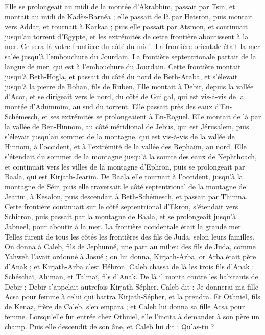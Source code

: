 \begin{multicols}{2}
Elle se prolongeait au midi de la montée d’Akrabbim, passait par Tsin, et montait au midi de Kadès-Barnéa ; elle passait de là par Hetsron, puis montait vers Addar, et tournait à Karkaa ;
puis elle passait par Atsmon, et continuait jusqu’au torrent d’Egypte, et les extrémités de cette frontière aboutissent à la mer. Ce sera là votre frontière du côté du midi.
La frontière orientale était la mer salée jusqu’à l’embouchure du Jourdain. La frontière septentrionale partait de la langue de mer, qui est à l’embouchure du Jourdain.
Cette frontière montait jusqu’à Beth-Hogla, et passait du côté du nord de Beth-Araba, et s’élevait jusqu’à la pierre de Bohan, fils de Ruben.
Elle montait à Debir, depuis la vallée d’Acor, et se dirigeait vers le nord, du côté de Guilgal, qui est vis-à-vis de la montée d’Adummim, au sud du torrent. Elle passait près des eaux d’En-Schémesch, et ses extrémités se prolongeaient à En-Roguel.
Elle montait de là par la vallée de Ben-Hinnom, au côté méridional de Jebus, qui est Jérusalem, puis s’élevait jusqu’au sommet de la montagne, qui est vis-à-vis de la vallée de Hinnom, à l’occident, et à l’extrémité de la vallée des Rephaïm, au nord.
Elle s’étendait du sommet de la montagne jusqu’à la source des eaux de Nephthoach, et continuait vers les villes de la montagne d’Ephron, puis se prolongeait par Baala, qui est Kirjath-Jearim.
De Baala elle tournait à l’occident, jusqu’à la montagne de Séir, puis elle traversait le côté septentrional de la montagne de Jearim, à Kesalon, puis descendait à Beth-Schémesch, et passait par Thimna.
Cette frontière continuait sur le côté septentrional d’Ekron, s’étendait vers Schicron, puis passait par la montagne de Baala, et se prolongeait jusqu’à Jabneel, pour aboutir à la mer.
La frontière occidentale était la grande mer. Telles furent de tous les côtés les frontières des fils de Juda, selon leurs familles.
On donna à Caleb, fils de Jephunné, une part au milieu des fils de Juda, comme Yahweh l’avait ordonné à Josué ; on lui donna, Kirjath-Arba, or Arba était père d’Anak ; et Kirjath-Arba c’est Hébron.
Caleb chassa de là les trois fils d’Anak : Schéschaï, Ahiman, et Talmaï, fils d’Anak.
De là il monta contre les habitants de Debir ; Debir s’appelait autrefois Kirjath-Sépher.
Caleb dit : Je donnerai ma fille Acsa pour femme à celui qui battra Kirjath-Sépher, et la prendra.
Et Othniel, fils de Kenaz, frère de Caleb, s’en empara ; et Caleb lui donna sa fille Acsa pour femme.
Lorsqu’elle fut entrée chez Othniel, elle l’incita à demander à son père un champ. Puis elle descendit de son âne, et Caleb lui dit : Qu’as-tu ?

\end{multicols}
